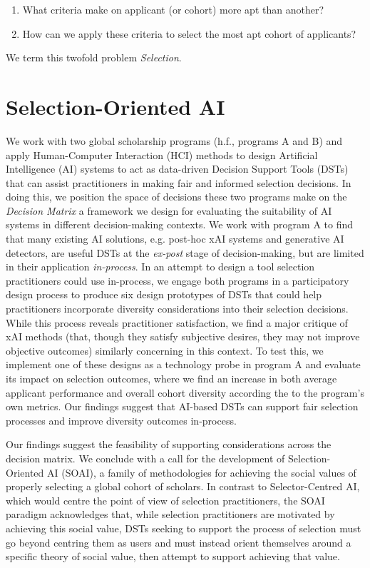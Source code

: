 \begin{enumerate}
    \item What criteria make on applicant (or cohort) more apt than another?
    \item How can we apply these criteria to select the most apt cohort of applicants?
\end{enumerate}

We term this twofold problem \emph{Selection}.

\section{Selection-Oriented AI}
We work with two global scholarship programs (h.f., programs A and B) and apply Human-Computer Interaction (HCI) methods to design Artificial Intelligence (AI) systems to act as data-driven Decision Support Tools (DSTs) that can assist practitioners in making fair and informed selection decisions. In doing this, we position the space of decisions these two programs make on the \emph{Decision Matrix} a framework we design for evaluating the suitability of AI systems in different decision-making contexts. We work with program A to find that many existing AI solutions, e.g. post-hoc xAI systems and generative AI detectors, are useful DSTs at the \emph{ex-post} stage of decision-making, but are limited in their application \emph{in-process}. In an attempt to design a tool selection practitioners could use in-process, we engage both programs in a participatory design process to produce six design prototypes of DSTs that could help practitioners incorporate diversity considerations into their selection decisions. While this process reveals practitioner satisfaction, we find a major critique of xAI methods (that, though they satisfy subjective desires, they may not improve objective outcomes) similarly concerning in this context. To test this, we implement one of these designs as a technology probe in program A and evaluate its impact on selection outcomes, where we find an increase in both average applicant performance and overall cohort diversity according the to the program's own metrics. Our findings suggest that AI-based DSTs can support fair selection processes and improve diversity outcomes in-process.

Our findings suggest the feasibility of supporting considerations across the decision matrix. We conclude with a call for the development of Selection-Oriented AI (SOAI), a family of methodologies for achieving the social values of properly selecting a global cohort of scholars. In contrast to Selector-Centred AI, which would centre the point of view of selection practitioners, the SOAI paradigm acknowledges that, while selection practitioners are motivated by achieving this social value, DSTs seeking to support the process of selection must go beyond centring them as users and must instead orient themselves around a specific theory of social value, then attempt to support achieving that value.


